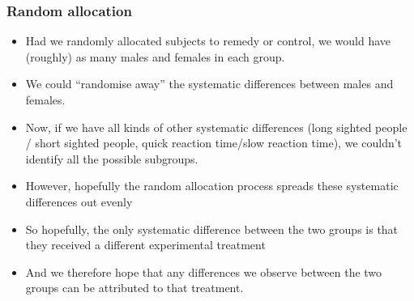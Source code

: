 {\begin{frame}[label=simpson5]
\end{frame}


\begin{frame}[label=simpson6]
\frametitle{Random allocation}

\begin{itemize}
\item Had we randomly allocated subjects to remedy or control, we would have (roughly) as many males and females in each group.   
\item We could ``randomise away'' the systematic differences between males and females.
\item Now, if we have all kinds of other systematic differences (long sighted people / short sighted people, quick reaction time/slow reaction time), we couldn't identify all the possible subgroups.
\item However, hopefully the random allocation process spreads these systematic differences out evenly
\item So hopefully, the only systematic difference between the two groups is that they received a different experimental treatment
\item And we therefore hope that any differences we observe between the two groups can be attributed to that treatment.
\end{itemize}

\end{frame}

}

